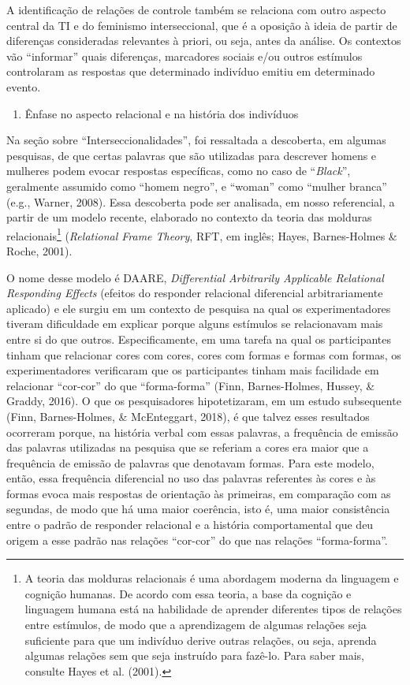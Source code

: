 A identificação de relações de controle também se relaciona com outro aspecto central da TI e do feminismo interseccional, que é a oposição à ideia de partir de diferenças consideradas relevantes à priori, ou seja, antes da análise. Os contextos vão ``informar'' quais diferenças, marcadores sociais e/ou outros estímulos controlaram as respostas que determinado indivíduo emitiu em determinado evento. 

\begin{enumerate}[resume]
    \item Ênfase no aspecto relacional e na história dos indivíduos
\end{enumerate}

Na seção sobre ``Interseccionalidades'', foi ressaltada a descoberta, em algumas pesquisas, de que certas palavras que são utilizadas para descrever homens e mulheres podem evocar respostas específicas, como no caso de ``\textit{Black}'', geralmente assumido como ``homem negro'', e ``woman'' como ``mulher branca'' (e.g., Warner, 2008). Essa descoberta pode ser analisada, em nosso referencial, a partir de um modelo recente, elaborado no contexto da teoria das molduras relacionais\footnote{A teoria das molduras relacionais é uma abordagem moderna da linguagem e cognição humanas. De acordo com essa teoria, a base da cognição e linguagem humana está na habilidade de aprender diferentes tipos de relações entre estímulos, de modo que a aprendizagem de algumas relações seja suficiente para que um indivíduo derive outras relações, ou seja, aprenda algumas relações sem que seja instruído para fazê-lo. Para saber mais, consulte Hayes et al. (2001).} (\textit{Relational Frame Theory}, RFT, em inglês; Hayes, Barnes-Holmes \& Roche, 2001).

O nome desse modelo é DAARE, \textit{Differential Arbitrarily Applicable Relational Responding Effects} (efeitos do responder relacional diferencial arbitrariamente aplicado) e ele surgiu em um contexto de pesquisa na qual os experimentadores tiveram dificuldade em explicar porque alguns estímulos se relacionavam mais entre si do que outros. Especificamente, em uma tarefa na qual os participantes tinham que relacionar cores com cores, cores com formas e formas com formas, os experimentadores verificaram que os participantes tinham mais facilidade em relacionar ``cor-cor'' do que ``forma-forma'' (Finn, Barnes-Holmes, Hussey, \& Graddy, 2016). O que os pesquisadores hipotetizaram, em um estudo subsequente (Finn, Barnes-Holmes, \& McEnteggart, 2018), é que talvez esses resultados ocorreram porque, na história verbal com essas palavras, a frequência de emissão das palavras utilizadas na pesquisa que se referiam a cores era maior que a frequência de emissão de palavras que denotavam formas. Para este modelo, então, essa frequência diferencial no uso das palavras referentes às cores e às formas evoca mais respostas de orientação às primeiras, em comparação com as segundas, de modo que há uma maior coerência, isto é, uma maior consistência entre o padrão de responder relacional e a história comportamental que deu origem a esse padrão nas relações ``cor-cor'' do que nas relações ``forma-forma''. 

